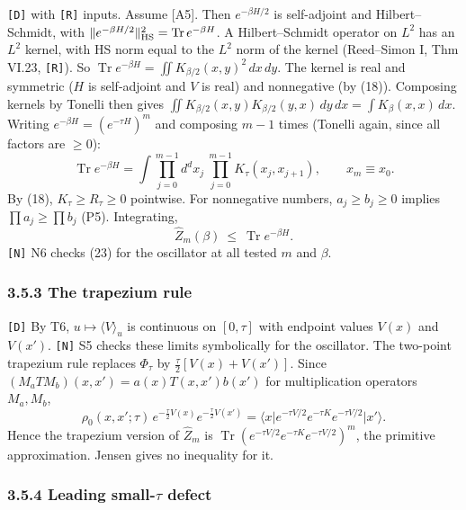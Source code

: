 \documentclass[11pt,a4paper]{article}
\begin{document}
\texttt{[D]} with \texttt{[R]} inputs. Assume {[}A5{]}. Then \(e^{-\beta H/2}\) is self-adjoint and Hilbert--Schmidt, with \(\|e^{-\beta H/2}\|_{\rm HS}^2=\operatorname{Tr}e^{-\beta H}\). A Hilbert--Schmidt operator on \(L^2\) has an \(L^2\) kernel, with HS norm equal to the \(L^2\) norm of the kernel (Reed--Simon I, Thm VI.23, \texttt{[R]}). So \(\operatorname{Tr}e^{-\beta H}=\iint K_{\beta/2}(x,y)^2\,dx\,dy\). The kernel is real and symmetric (\(H\) is self-adjoint and \(V\) is real) and nonnegative (by (18)). Composing kernels by Tonelli then gives \(\iint K_{\beta/2}(x,y)K_{\beta/2}(y,x)\,dy\,dx=\int K_\beta(x,x)\,dx\). Writing \(e^{-\beta H}=(e^{-\tau H})^m\) and composing \(m-1\) times (Tonelli again, since all factors are \(\ge0\)):
\[\operatorname{Tr}e^{-\beta H}=\int\prod_{j=0}^{m-1}d^dx_j\ \prod_{j=0}^{m-1}K_\tau(x_j,x_{j+1}),\qquad x_m\equiv x_0.\tag{22}\]
By (18), \(K_\tau\ge R_\tau\ge0\) pointwise. For nonnegative numbers, \(a_j\ge b_j\ge0\) implies \(\prod a_j\ge\prod b_j\) (P5). Integrating,
\[\hat Z_m(\beta)\ \le\ \operatorname{Tr}e^{-\beta H}.\tag{23}\]
\texttt{[N]} N6 checks (23) for the oscillator at all tested \(m\) and \(\beta\).

\hypertarget{the-trapezium-rule}{%
\subsubsection{3.5.3 The trapezium rule}\label{the-trapezium-rule}}

\texttt{[D]} By T6, \(u\mapsto\langle V\rangle_u\) is continuous on \([0,\tau]\) with endpoint values \(V(x)\) and \(V(x')\). \texttt{[N]} S5 checks these limits symbolically for the oscillator. The two-point trapezium rule replaces \(\Phi_\tau\) by \(\frac\tau2[V(x)+V(x')]\). Since \((M_aTM_b)(x,x')=a(x)T(x,x')b(x')\) for multiplication operators \(M_a,M_b\),
\[\rho_0(x,x';\tau)\,e^{-\frac\tau2V(x)}e^{-\frac\tau2V(x')}=\big\langle x\big|e^{-\tau V/2}e^{-\tau K}e^{-\tau V/2}\big|x'\big\rangle.\tag{24}\]
Hence the trapezium version of \(\hat Z_m\) is \(\operatorname{Tr}(e^{-\tau V/2}e^{-\tau K}e^{-\tau V/2})^m\), the primitive approximation. Jensen gives no inequality for it.

\hypertarget{leading-small-tau-defect}{%
\subsubsection{\texorpdfstring{3.5.4 Leading small-\(\tau\) defect}{3.5.4 Leading small-\textbackslash tau defect}}\label{leading-small-tau-defect}}
\end{document}
